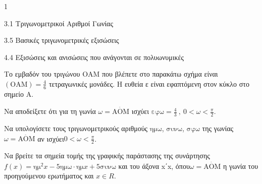 \begin{ylh}{1}
\item 3.1 Τριγωνομετρικοί Αριθμοί Γωνίας
\item 3.5 Βασικές τριγωνομετρικές εξισώσεις
\item 4.4 Εξισώσεις και ανισώσεις που ανάγονται σε πολυωνυμικές
\end{ylh}
Το εμβαδόν του τριγώνου ΟΑΜ που βλέπετε στο παρακάτω σχήμα είναι $(\text{OAM}) = \frac{4}{6}$ τετραγωνικές μονάδες. Η ευθεία ε είναι εφαπτόμενη στον κύκλο στο σημείο Α.
\begin{alist}
\item Να αποδείξετε ότι για τη γωνία $\omega = \overset{\hat{}}{\text{ΑΟΜ}}$ ισχύει $\text{εφω} = \frac{4}{3}\ ,\ 0 < \omega < \frac{\pi}{2}$.
\item Να υπολογίσετε τους τριγωνομετρικούς αριθμούς $\text{ημω}$, $\text{συνω}$, $\text{σφω}$ της γωνίας $\omega = \overset{\hat{}}{\text{ΑΟΜ}}$ αν ισχύει$0 < \omega < \frac{\pi}{2}$.
\item Να βρείτε τα σημεία τομής της γραφικής παράστασης της συνάρτησης $f(x) = \text{ημ}^{2}x - 5\text{ημω} \cdot \text{ημ}x + 5\text{συνω}$ και του άξονα x΄x, όπου$\omega = \overset{\hat{}}{\text{ΑΟΜ}}$ η γωνία του προηγούμενου ερωτήματος και $x \in R$.
\begin{center}
\end{center}
\end{alist}

